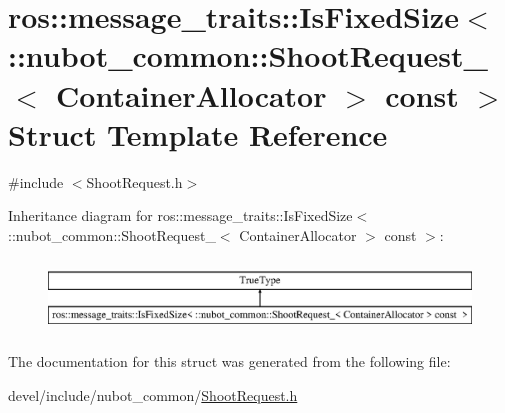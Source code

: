 \hypertarget{structros_1_1message__traits_1_1IsFixedSize_3_01_1_1nubot__common_1_1ShootRequest___3_01ContainerAllocator_01_4_01const_01_01_4}{\section{ros\-:\-:message\-\_\-traits\-:\-:Is\-Fixed\-Size$<$ \-:\-:nubot\-\_\-common\-:\-:Shoot\-Request\-\_\-$<$ Container\-Allocator $>$ const $>$ Struct Template Reference}
\label{structros_1_1message__traits_1_1IsFixedSize_3_01_1_1nubot__common_1_1ShootRequest___3_01ContainerAllocator_01_4_01const_01_01_4}
}


{\ttfamily \#include $<$Shoot\-Request.\-h$>$}

Inheritance diagram for ros\-:\-:message\-\_\-traits\-:\-:Is\-Fixed\-Size$<$ \-:\-:nubot\-\_\-common\-:\-:Shoot\-Request\-\_\-$<$ Container\-Allocator $>$ const $>$\-:\begin{figure}[H]
\begin{center}
\leavevmode
\includegraphics[height=1.964912cm]{structros_1_1message__traits_1_1IsFixedSize_3_01_1_1nubot__common_1_1ShootRequest___3_01ContainerAllocator_01_4_01const_01_01_4}
\end{center}
\end{figure}


The documentation for this struct was generated from the following file\-:\begin{DoxyCompactItemize}
\item 
devel/include/nubot\-\_\-common/\hyperlink{ShootRequest_8h}{Shoot\-Request.\-h}\end{DoxyCompactItemize}
